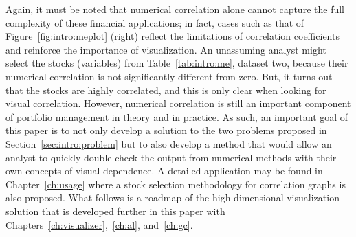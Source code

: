 Again, it must be noted that numerical correlation alone cannot capture the 
full complexity of these financial applications; in fact, cases such as that of 
Figure~\ref{fig:intro:meplot} (right) reflect the limitations of correlation 
coefficients and reinforce the importance of visualization. An unassuming 
analyst might select the stocks (variables) from Table~\ref{tab:intro:me}, 
dataset two, because their numerical correlation is not significantly different 
from zero. But, it turns out that the stocks are highly correlated, and this is 
only clear when looking for visual correlation. However, numerical correlation 
is still an important component of portfolio management in theory and in 
practice. As such, an important goal of this paper is to not only develop a 
solution to the two problems proposed in Section~\ref{sec:intro:problem} but to 
also develop a method that would allow an analyst to quickly double-check the 
output from numerical methods with their own concepts of visual dependence. 
A detailed application may be found in Chapter~\ref{ch:usage} where
a stock selection methodology for correlation graphs is also proposed. 
What follows is a roadmap of the high-dimensional visualization solution that 
is developed further in this paper with 
Chapters~\ref{ch:visualizer},~\ref{ch:al}, and~\ref{ch:gc}.